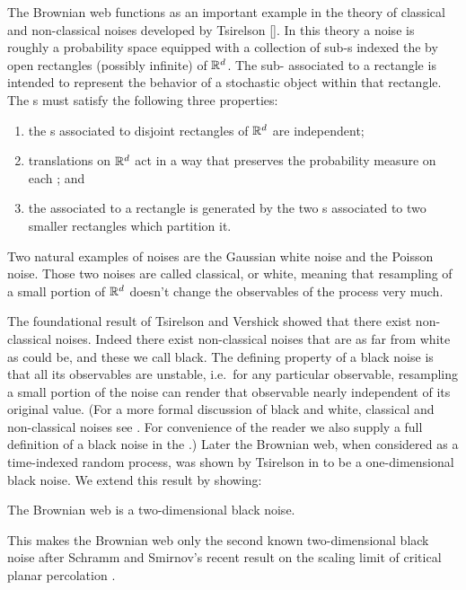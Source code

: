 {The Brownian web functions as an important example in the theory of
classical and non-classical noises developed by Tsirelson []. In this
theory a noise is roughly a probability space equipped with a collection
of sub-\sigfield{}s indexed the by open rectangles (possibly infinite) of
$\mathbb{R}^d$.  The sub-\sigfield{} associated to a rectangle is intended to
represent the behavior of a stochastic object within that rectangle.
The \sigfield{}s must satisfy the following three properties:
\begin{enumerate}
\item the \sigfield{}s associated to disjoint rectangles of $\mathbb{R}^d$ are
independent;
\item translations on $\mathbb{R}^d$ act in a way that preserves the
probability measure on each \sigfield{}; and
\item the \sigfield{}
associated to a rectangle is generated by the two \sigfield{}s
associated to two smaller rectangles which partition it.
\end{enumerate}
Two natural examples of noises are the Gaussian white noise
and the Poisson noise. Those two noises are called classical, or white,
meaning that
resampling of a small portion of $\mathbb{R}^d$ doesn't change the observables of the
process very much.

The foundational result of Tsirelson and Vershick showed that there
exist non-classical noises.  Indeed there exist non-classical noises
that are as far from white as could be, and these we call black.  The
defining property of a black noise is that all its observables are
unstable, i.e.\ for any particular observable, resampling a small portion of the noise can
render that observable nearly independent of its original
value.  (For a more formal discussion of black and white, classical
and non-classical noises see \TODO{}{}.  For convenience of the reader
we also supply a full definition of a black noise in
the .)  Later the Brownian web,
when considered as a time-indexed random process,
was shown by Tsirelson in \TODO{}{} to be a one-dimensional black noise.  We
extend this
result by showing:

\begin{theorem}
\label{thm:bw-2d-black-noise}
The Brownian web is a
two-dimensional black noise.
\end{theorem}

This makes the Brownian web only the second
known two-dimensional black noise after Schramm and Smirnov's
recent result on the scaling limit of critical planar
percolation .

}
